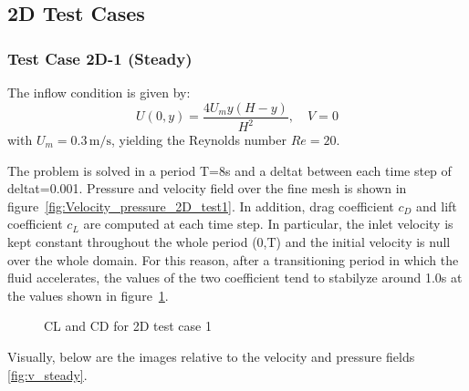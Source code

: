 \documentclass{article}
\begin{document}
\subsection{2D Test Cases}
\subsubsection{Test Case 2D-1 (Steady)}

The inflow condition is given by:
\[
U(0, y) = \frac{4U_m y (H - y)}{H^2}, \quad V = 0
\]
with \(U_m = 0.3 \, \text{m/s}\), yielding the Reynolds number \(Re = 20\). 

The problem is solved in a period T=8s and a deltat between each time step of deltat=0.001. 
Pressure and velocity field over the fine mesh is shown in figure~\ref{fig:Velocity_pressure_2D_test1}.
In addition, drag coefficient \(c_D\) and lift coefficient \(c_L\) are computed at each time step. In particular, the inlet velocity is kept constant throughout the whole period (0,T) and the initial velocity is null over the whole domain. For this reason, after a transitioning period in which the fluid accelerates, the values of the two coefficient tend to stabilyze around 1.0s at the values shown in figure~\ref{fig:Cd_Cl_2D_test1}.

\begin{figure}
\centering
    \hfill
    
\caption{CL and CD for 2D test case 1}
    \label{fig:Cd_Cl_2D_test1}
\end{figure}

Visually, below are the images relative to the velocity and pressure fields \ref{fig:v_steady}.
\begin{figure}
    \centering    
    \hfill
    
    \vspace{1em} %
\end{figure}
\end{document}
